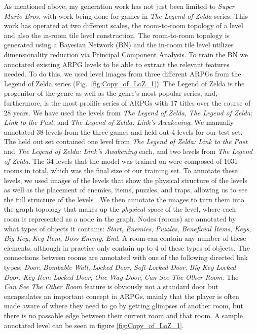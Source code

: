 \documentclass[a4paper]{article}
\begin{document}
As mentioned above, my generation work has not just been limited to \textit{Super Mario Bros.} with work being done for games in \textit{The Legend of Zelda} series.  This work has operated at two different scales, the room-to-room topology of a level and also the in-room tile level construction.  The room-to-room topology is generated using a Bayesian Network (BN) and the in-room tile level utilizes dimensionality reduction via Principal Component Analysis.  To train the BN we annotated existing ARPG levels to be able to extract the relevant features needed. To do this, we used level images from three different ARPGs from the Legend of Zelda series (Fig.~\ref{fig:Copy_of_LoZ_1}). The Legend of Zelda is the progenitor of the genre as well as the genre's most popular series, and, furthermore, is the most prolific series of ARPGs with 17 titles over the course of 28 years. We have used the levels from \textit{The Legend of Zelda}, \textit{The Legend of Zelda: Link to the Past}, and \textit{The Legend of Zelda: Link's Awakening}. We manually annotated 38 levels from the three games and held out 4 levels for our test set. The held out set contained one level from \textit{The Legend of Zelda: Link to the Past} and \textit{The Legend of Zelda: Link's Awakening} each, and two levels from \textit{The Legend of Zelda}. The 34 levels that the model was trained on were composed of 1031 rooms in total, which was the final size of our training set. To annotate these levels, we used images of the levels that show the physical structure of the levels as well as the placement of enemies, items, puzzles, and traps, allowing us to see the full structure of the levels \cite{ZELDASHRINE,ANGELFIRE,ZELDAELEMENTS,IANALBERT}. We then annotate the images to turn them into the graph topology that makes up the \textit{physical space} of the level, where each room is represented as a node in the graph. Nodes (rooms) are annotated by what types of objects it contains: \textit{Start}, \textit{Enemies}, \textit{Puzzles}, \textit{Beneficial Items}, \textit{Keys}, \textit{Big Key}, \textit{Key Item}, \textit{Boss Enemy}, \textit{End}.  A room can contain any number of these elements, although in practice only contain up to 4 of these types of objects.  
 The connections between rooms are annotated with one of the following directed link types:   \textit{Door}, \textit{Bombable Wall}, \textit{Locked Door}, \textit{Soft-Locked Door}, \textit{Big Key Locked Door}, \textit{Key Item Locked Door}, \textit{One Way Door}, \textit{Can See The Other Room}. The \textit{Can See The Other Room} feature is obviously not a standard door but encapsulates an important concept in ARPGs, mainly that the player is often made aware of where they need to go by getting glimpses of another room, but there is no passable edge between their current room and that room.  A sample annotated level can be seen in figure \ref{fig:Copy_of_LoZ_1}.
\end{document}
